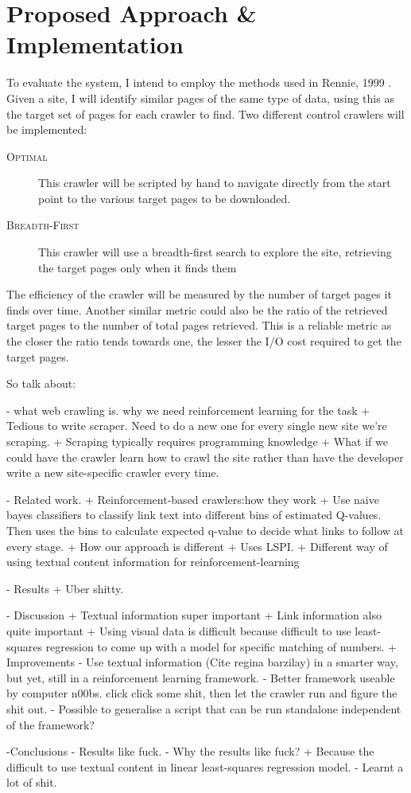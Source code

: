 \documentclass{article}[12 pt]
\begin{document}
\section{Proposed Approach \& Implementation}
To evaluate the system, I intend to employ the methods used in Rennie, 1999 \cite{Rennie1999}. Given a site, I will identify similar pages of the same type of data, using this as the target set of pages for each crawler to find. Two different control crawlers will be implemented:
\begin{description}
	\item[\textsc{Optimal}] This crawler will be scripted by hand to navigate directly from the start point to the various target pages to be downloaded.
	\item[\textsc{Breadth-First}] This crawler will use a breadth-first search to explore the site, retrieving the target pages only when it finds them
\end{description}
The efficiency of the crawler will be measured by the number of target pages it finds over time. Another similar metric could also be the ratio of the retrieved target pages to the number of total pages retrieved. This is a reliable metric as the closer the ratio tends towards one, the lesser the I/O cost required to get the target pages.


So talk about:

- what web crawling is. why we need reinforcement learning for the task
	+ Tedious to write scraper. Need to do a new one for every single new site we're scraping.
	+ Scraping typically requires programming knowledge
	+ What if we could have the crawler learn how to crawl the site rather than have the developer write a new site-specific crawler every time.

- Related work.
	+ Reinforcement-based crawlers:how they work
		+ Use naive bayes classifiers to classify link text into different bins of estimated Q-values. Then uses the bins to calculate expected q-value to decide what links to follow at every stage.
		+ How our approach is different
			+ Uses LSPI.
			+ Different way of using textual content information for reinforcement-learning

- Results
	+ Uber shitty.

- Discussion
	+ Textual information super important
	+ Link information also quite important
	+ Using visual data is difficult because difficult to use least-squares regression to come up with a model for specific matching of numbers.
	+ Improvements
		- Use textual information (Cite regina barzilay) in a smarter way, but yet, still in a reinforcement learning framework.
		- Better framework useable by computer n00bs. click click some shit, then let the crawler run and figure the shit out.
		- Possible to generalise a script that can be run standalone independent of the framework?

-Conclusions
	- Results like fuck.
	- Why the results like fuck?
		+ Because the difficult to use textual content in linear least-squares regression model.
	- Learnt a lot of shit.





\end{document}
